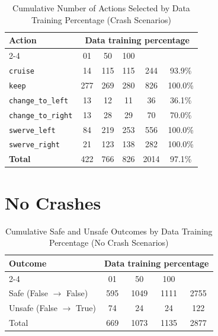 \documentclass{article}
\begin{document}
\begin{table}[h]
\centering
\caption{Cumulative Number of Actions Selected by Data Training Percentage (Crash Scenarios)}
\begin{tabular}{l|ccc|c|c}
\toprule
\multirow{2}{*}{Action} & \multicolumn{5}{c|}{Data training percentage} & \multirow{2}{*}{Total} & \multirow{2}{*}{Safe (\%)} \\
\cmidrule{2-4}
 & 01 & 50 & 100 & & \\
\midrule
\texttt{cruise} & 14 & 115 & 115 & 244 & 93.9\% \\ 
\texttt{keep} & 277 & 269 & 280 & 826 & 100.0\% \\ 
\texttt{change\_to\_left} & 13 & 12 & 11 & 36 & 36.1\% \\ 
\texttt{change\_to\_right} & 13 & 28 & 29 & 70 & 70.0\% \\ 
\texttt{swerve\_left} & 84 & 219 & 253 & 556 & 100.0\% \\ 
\texttt{swerve\_right} & 21 & 123 & 138 & 282 & 100.0\% \\ 
\midrule
\textbf{Total} & 422 & 766 & 826 & 2014 & 97.1\% \\ 
\bottomrule
\end{tabular}
\end{table}

\pagebreak
\section{No Crashes}

\begin{table}[h]
\centering
\caption{Cumulative Safe and Unsafe Outcomes by Data Training Percentage (No Crash Scenarios)}
\begin{tabular}{l|ccc|c}
\toprule
\multirow{2}{*}{Outcome} & \multicolumn{5}{c|}{Data training percentage} & \multirow{2}{*}{Total} \\
\cmidrule{2-4}
 & 01 & 50  & 100 & \\
\midrule
Safe (False $\rightarrow$ False) & 595 & 1049 & 1111 & 2755 \\ 
Unsafe (False $\rightarrow$ True) & 74 & 24 & 24 & 122 \\ 
\midrule
Total & 669 & 1073 & 1135 & 2877 \\ 
\bottomrule
\end{tabular}
\end{table}
\end{document}
